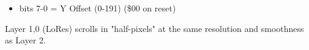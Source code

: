 \begin{itemize}
\item bits 7-0 = Y Offset (0-191) (\$00 on reset)
\end{itemize}
Layer 1,0 (LoRes) scrolls in "half-pixels" at the same resolution and
smoothness as Layer 2.

